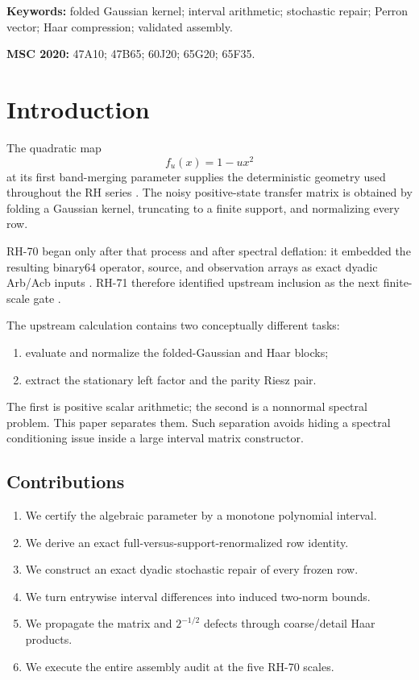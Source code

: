 \documentclass[11pt]{article}
\theoremstyle{definition}
\begin{document}
\noindent\textbf{Keywords:} folded Gaussian kernel; interval arithmetic;
stochastic repair; Perron vector; Haar compression; validated assembly.

\medskip
\noindent\textbf{MSC 2020:} 47A10; 47B65; 60J20; 65G20; 65F35.

\section{Introduction}

The quadratic map
\[
 f_u(x)=1-ux^2
\]
at its first band-merging parameter supplies the deterministic geometry used
throughout the RH series \citep{WangKneading2026,WangBoundary2026}.  The noisy
positive-state transfer matrix is obtained by folding a Gaussian kernel,
truncating to a finite support, and normalizing every row.

RH-70 began only after that process and after spectral deflation: it embedded
the resulting binary64 operator, source, and observation arrays as exact
dyadic Arb/Acb inputs \citep{WangFrozen2026}.  RH-71 therefore identified
upstream inclusion as the next finite-scale gate \citep{WangReview2026}.

The upstream calculation contains two conceptually different tasks:

\begin{enumerate}[leftmargin=2.2em]
 \item evaluate and normalize the folded-Gaussian and Haar blocks;
 \item extract the stationary left factor and the parity Riesz pair.
\end{enumerate}

The first is positive scalar arithmetic; the second is a nonnormal spectral
problem.  This paper separates them.  Such separation avoids hiding a
spectral conditioning issue inside a large interval matrix constructor.

\subsection*{Contributions}

\begin{enumerate}[leftmargin=2.2em]
 \item We certify the algebraic parameter by a monotone polynomial interval.
 \item We derive an exact full-versus-support-renormalized row identity.
 \item We construct an exact dyadic stochastic repair of every frozen row.
 \item We turn entrywise interval differences into induced two-norm bounds.
 \item We propagate the matrix and $2^{-1/2}$ defects through coarse/detail
       Haar products.
 \item We execute the entire assembly audit at the five RH-70 scales.
\end{enumerate}
\end{document}
